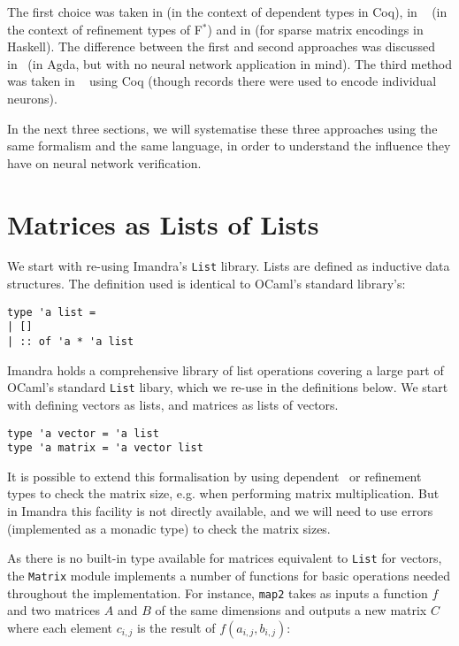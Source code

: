 \documentclass[runningheads]{llncs}
\begin{document}
The first choice was taken in \cite{heras_incidence_2011} (in the context of dependent types in Coq), in ~\cite{KokkeKKAA20} (in the context of refinement types of F$^*$) and in \cite{grant_sparse_1996} (for sparse matrix encodings in Haskell).  The difference between the first and second approaches was
discussed in~\cite{wood_vectors_2019} (in Agda, but with no neural network application in mind).
The third method was taken in ~\cite{MariaBLFGRG22} using Coq (though records there were used to encode individual neurons).

In the next three sections, we will systematise these three approaches using the same formalism and the same language, in order to understand  the influence they have on neural network verification.


\section{Matrices as Lists of Lists} \label{sec:lists}
We start with re-using  Imandra's  \lstinline{List} library. Lists are defined as inductive data structures. The definition used is identical to OCaml's standard library's:

\begin{lstlisting}
type 'a list =
| []
| :: of 'a * 'a list
\end{lstlisting}


Imandra holds a comprehensive library of list operations covering a large part of OCaml's standard \lstinline{List} libary, which we re-use in the definitions below.
We start with defining vectors as lists, and matrices as lists of vectors. 

\begin{lstlisting}[frame=none, language=caml]
type 'a vector = 'a list
type 'a matrix = 'a vector list 
\end{lstlisting}

It is possible to extend this formalisation by using dependent~\cite{heras_incidence_2011} or refinement~\cite{KokkeKKAA20} types to check the matrix size, e.g. when performing matrix multiplication. But in Imandra this facility is not directly available, and we will need to use errors (implemented as a monadic type) to check the matrix sizes.

As there is no built-in type available for matrices equivalent to \lstinline{List} for vectors, the \lstinline{Matrix} module implements a number of functions for basic operations needed throughout the implementation. For instance, \lstinline{map2} takes as inputs a function $f$ and two matrices $A$ and $B$ of the same dimensions and outputs a new matrix $C$ where each element $c_{i,j}$ is the result of $f(a_{i, j}, b_{i, j})$:
\end{document}
